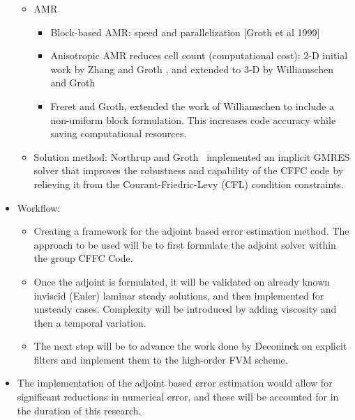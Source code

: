 \begin{itemize}
\begin{itemize}
\item AMR
   \begin{itemize}
   \item Block-based AMR: speed and parallelization [Groth et al 1999]
   \item Anisotropic AMR reduces cell count (computational cost): 2-D initial work by Zhang and Groth \cite{zhang:2011b}, and extended to 3-D by Williamschen and Groth \cite{Williamschen:2013}
   \item Freret and Groth, \cite{Freret:2015} extended the work of Williamschen to include a non-uniform block formulation. This increases code accuracy while saving computational resources.
   \end{itemize}
   
\item Solution method: Northrup and Groth~\cite{Northrup:2013, northrup:2013a} implemented an implicit GMRES solver that improves the robustness and capability of the CFFC code by relieving it from the Courant-Friedric-Levy (CFL) condition constraints.  

\end{itemize}

\item Workflow: 
\begin{itemize}
	\item Creating a framework for the adjoint based error estimation method. The approach to be used will be to first formulate the adjoint solver within the group CFFC Code. 
	\item Once the adjoint is formulated, it will be validated on already known inviscid (Euler) laminar steady solutions, and then implemented for unsteady cases. Complexity will be introduced by adding viscosity and then a temporal variation. 
	\item The next step will be to advance the work done by Deconinck on explicit filters and implement them \cite{Deconinck:2008} to the high-order FVM scheme. 
\end{itemize}

\item The implementation of the adjoint based error estimation would allow for significant reductions in numerical error, and these will be accounted for in the duration of this research.
\end{itemize}

